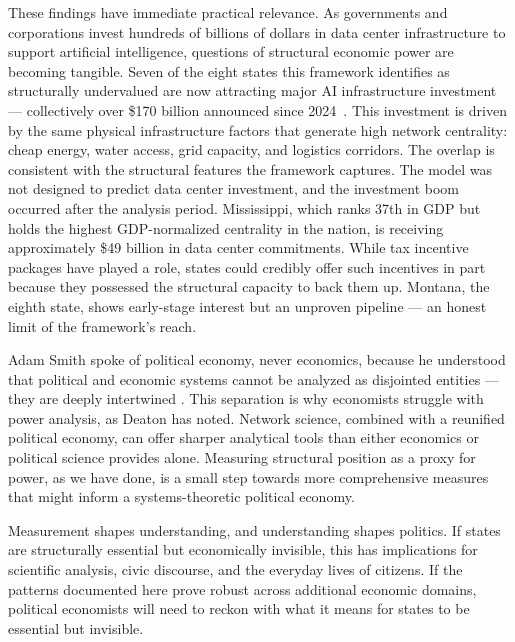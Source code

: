 \documentclass[12pt,oneside]{book}
\begin{document}
These findings have immediate practical relevance. As governments and corporations invest hundreds of billions of dollars in data center infrastructure to support artificial intelligence, questions of structural economic power are becoming tangible. Seven of the eight states this framework identifies as structurally undervalued are now attracting major AI infrastructure investment --- collectively over \$170 billion announced since 2024~\cite{xai_mississippi_2026, amazon_mississippi_2025, compass_mississippi_2025, hut8_louisiana_2025, amazon_louisiana_2025}. This investment is driven by the same physical infrastructure factors that generate high network centrality: cheap energy, water access, grid capacity, and logistics corridors. The overlap is consistent with the structural features the framework captures. The model was not designed to predict data center investment, and the investment boom occurred after the analysis period. Mississippi, which ranks 37th in GDP but holds the highest GDP-normalized centrality in the nation, is receiving approximately \$49 billion in data center commitments. While tax incentive packages have played a role, states could credibly offer such incentives in part because they possessed the structural capacity to back them up. Montana, the eighth state, shows early-stage interest but an unproven pipeline --- an honest limit of the framework's reach. 

Adam Smith spoke of political economy, never economics, because he understood that political and economic systems cannot be analyzed as disjointed entities --- they are deeply intertwined \cite{smith_wealth_1776}. This separation is why economists struggle with power analysis, as Deaton has noted. Network science, combined with a reunified political economy, can offer sharper analytical tools than either economics or political science provides alone. Measuring structural position as a proxy for power, as we have done, is a small step towards more comprehensive measures that might inform a systems-theoretic political economy. 

Measurement shapes understanding, and understanding shapes politics. If states are structurally essential but economically invisible, this has implications for scientific analysis, civic discourse, and the everyday lives of citizens. If the patterns documented here prove robust across additional economic domains, political economists will need to reckon with what it means for states to be essential but invisible.
\end{document}
